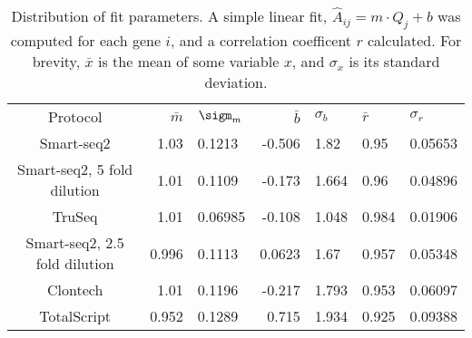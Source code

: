 
\begin{table}[htdp]

\caption{Distribution of fit parameters. A simple linear fit,
             $\hat{A}_{ij} = m \cdot Q_{j} + b$
             was computed for each gene $i$, and a correlation coefficent $r$
             calculated.  For brevity,
             $\bar{x}$ is the mean of some variable $x$, and $\sigma_x$ is its
             standard deviation.  }
\begin{center}
\begin{tabular}{|c|r@{$\pm$}l|r@{$\pm$}l|}
Protocol & $\bar{m}$ & $\sigm_m$ & $\bar{b}$ & $\sigma_b$ & $\bar{r}$ & $\sigma_r$ \\
Smart-seq2 & 1.03 & 0.1213 & -0.506 & 1.82 & 0.95 & 0.05653 \\
Smart-seq2, 5 fold dilution & 1.01 & 0.1109 & -0.173 & 1.664 & 0.96 & 0.04896 \\
TruSeq & 1.01 & 0.06985 & -0.108 & 1.048 & 0.984 & 0.01906 \\
Smart-seq2, 2.5 fold dilution & 0.996 & 0.1113 & 0.0623 & 1.67 & 0.957 & 0.05348 \\
Clontech & 1.01 & 0.1196 & -0.217 & 1.793 & 0.953 & 0.06097 \\
TotalScript & 0.952 & 0.1289 & 0.715 & 1.934 & 0.925 & 0.09388 \\
\end{tabular}
\label{tab:fits}
\end{center}
\end{table}



              